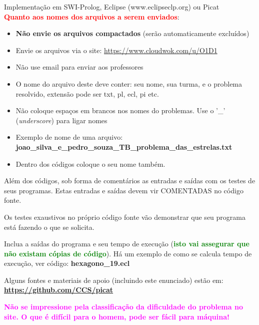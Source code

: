 \documentclass[a4paper,12pt]{article}
\begin{document}
\begin{flushleft}
\vspace{0.5cm}
 Implementação em SWI-Prolog, Eclipse (www.eclipseclp.org) ou Picat\\

\vspace{0.5cm}
 \textcolor{red}{\textbf{Quanto aos nomes dos arquivos a serem enviados}}:
\begin{itemize}
  \item \textbf{Não envie os arquivos compactados} (serão automaticamente excluídos)
  \item Envie os arquivos  via o site: \textcolor{red}{\url{https://www.cloudwok.com/u/O1D1}}

  \item Não use email para enviar aos professores
  
  \item O nome do arquivo deste deve conter: seu nome,
  sua turma, e o problema resolvido, extensão pode ser txt, pl, ecl, pi etc.
  \item Não coloque espaços em brancos nos nomes do problemas. Use o '\_'  (\textit{underscore}) para ligar nomes
  \item Exemplo de nome de uma arquivo: \\ \textbf{joao\_silva\_e\_pedro\_souza\_TB\_problema\_das\_estrelas.txt}
  \item Dentro dos códigos coloque o seu nome também.
\end{itemize}


\vspace{0.5cm}
 Além dos códigos, sob forma de comentários as 
entradas e saídas com os testes de seus programas. Estas
entradas e saídas devem vir COMENTADAS no código fonte.

\vspace{0.5cm}
 Os testes exaustivos no próprio código fonte vão demonstrar que seu programa está fazendo o que se solicita.

\vspace{0.5cm}
 Inclua a saídas do programa e seu tempo de execução (\textbf{\textcolor{green}{isto vai assegurar que não existam cópias de código}}). Há um exemplo de como se calcula tempo de execução, ver código: \textbf{hexagono\_19.ecl}

\vspace{0.5cm}
 Alguns fontes e materiais de apoio (incluindo este enunciado) estão em: \textbf{\url{https://github.com/CCS/picat}} 

\vspace{0.5cm}
 \textbf{\textcolor{magenta}{Não se impressione pela classificação da dificuldade do problema no site. O que é difícil para o homem, pode ser fácil para máquina!}}

\end{flushleft}
\end{document}
